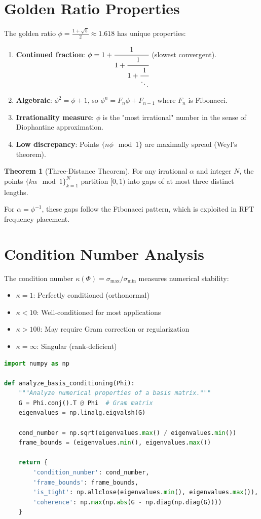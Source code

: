 \documentclass[11pt, a4paper, openany]{book}
\theoremstyle{definition}
\newtheorem{theorem}{Theorem}[chapter]
\begin{document}
\section{Golden Ratio Properties}
The golden ratio $\phi = \frac{1+\sqrt{5}}{2} \approx 1.618$ has unique properties:
\begin{enumerate}
    \item \textbf{Continued fraction}: $\phi = 1 + \cfrac{1}{1 + \cfrac{1}{1 + \cfrac{1}{\ddots}}}$ (slowest convergent).
    \item \textbf{Algebraic}: $\phi^2 = \phi + 1$, so $\phi^n = F_n\phi + F_{n-1}$ where $F_n$ is Fibonacci.
    \item \textbf{Irrationality measure}: $\phi$ is the "most irrational" number in the sense of Diophantine approximation.
    \item \textbf{Low discrepancy}: Points $\{n\phi \mod 1\}$ are maximally spread (Weyl's theorem).
\end{enumerate}

\begin{theorem}[Three-Distance Theorem]
For any irrational $\alpha$ and integer $N$, the points $\{k\alpha \mod 1\}_{k=1}^N$ partition $[0,1)$ into gaps of at most three distinct lengths.
\end{theorem}

For $\alpha = \phi^{-1}$, these gaps follow the Fibonacci pattern, which is exploited in RFT frequency placement.

\section{Condition Number Analysis}
The condition number $\kappa(\Phi) = \sigma_{\max}/\sigma_{\min}$ measures numerical stability:
\begin{itemize}
    \item $\kappa = 1$: Perfectly conditioned (orthonormal)
    \item $\kappa < 10$: Well-conditioned for most applications
    \item $\kappa > 100$: May require Gram correction or regularization
    \item $\kappa = \infty$: Singular (rank-deficient)
\end{itemize}

\begin{lstlisting}[language=Python, caption={Condition Number Computation}]
import numpy as np

def analyze_basis_conditioning(Phi):
    """Analyze numerical properties of a basis matrix."""
    G = Phi.conj().T @ Phi  # Gram matrix
    eigenvalues = np.linalg.eigvalsh(G)
    
    cond_number = np.sqrt(eigenvalues.max() / eigenvalues.min())
    frame_bounds = (eigenvalues.min(), eigenvalues.max())
    
    return {
        'condition_number': cond_number,
        'frame_bounds': frame_bounds,
        'is_tight': np.allclose(eigenvalues.min(), eigenvalues.max()),
        'coherence': np.max(np.abs(G - np.diag(np.diag(G))))
    }
\end{lstlisting}
\end{document}
